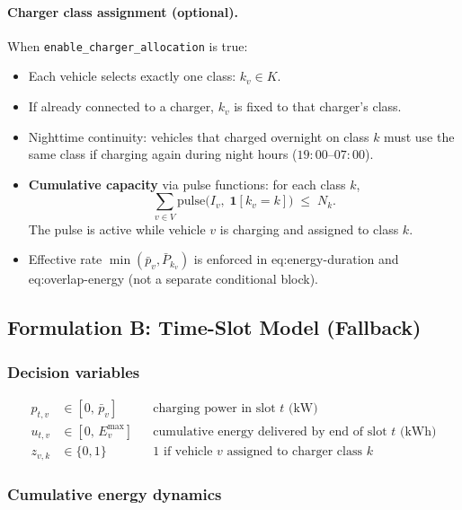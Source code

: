 \documentclass[11pt,a4paper]{article}
\newcommand{\1}{\mathbf{1}}
\begin{document}
\paragraph{Charger class assignment (optional).}
When \texttt{enable\_charger\_allocation} is true:
\begin{itemize}[nosep]
  \item Each vehicle selects exactly one class: $k_v \in K$.
  \item If already connected to a charger, $k_v$ is fixed to that charger's class.
  \item Nighttime continuity: vehicles that charged overnight on class $k$ must use
        the same class if charging again during night hours ($19{:}00$--$07{:}00$).
  \item \textbf{Cumulative capacity} via pulse functions: for each class $k$,
        \begin{equation}
          \sum_{v \in V} \mathrm{pulse}\bigl(I_v,\; \1[k_v = k]\bigr) \;\le\; N_k.
        \end{equation}
        The pulse is active while vehicle $v$ is charging and assigned to class $k$.
  \item Effective rate $\min(\bar{p}_v, \bar{P}_{k_v})$ is enforced in
        eq:energy-duration and eq:overlap-energy (not a separate conditional block).
\end{itemize}

\subsection{Formulation B: Time-Slot Model (Fallback)}

\subsubsection{Decision variables}

\begin{align}
  p_{t,v} &\in [0,\,\bar{p}_v] && \text{charging power in slot $t$ (kW)} \\
  u_{t,v} &\in [0,\, E_v^{\max}] && \text{cumulative energy delivered by end of slot $t$ (kWh)} \\
  z_{v,k} &\in \{0,1\} && \text{1 if vehicle $v$ assigned to charger class $k$}
\end{align}

\subsubsection{Cumulative energy dynamics}
\end{document}
